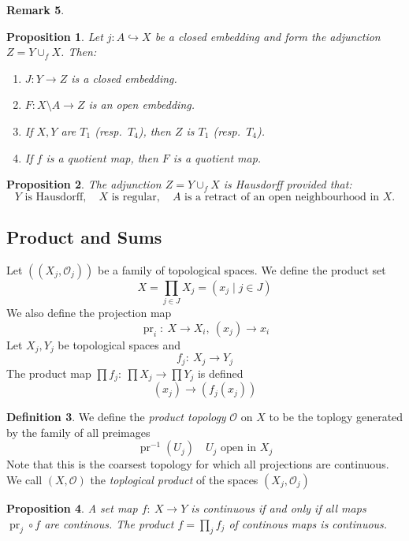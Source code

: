\documentclass[11pt,a4paper]{article}
\theoremstyle{definition}
\newtheorem{definition}{Definition}[section]
\newtheorem{remark}[definition]{Remark}
\theoremstyle{plain}
\newtheorem{proposition}[definition]{Proposition}
\theoremstyle{remark}
\begin{document}
\begin{remark}
\begin{proposition}
Let \(j\colon A\hookrightarrow X\) be a \emph{closed embedding} and form the adjunction \(Z=Y\cup_f X\).  Then:
\begin{enumerate}
  \item \(J\colon Y\to Z\) is a closed embedding.
  \item \(F\colon X\setminus A \to Z\) is an open embedding.
  \item If \(X,Y\) are \(T_1\) (resp.\ \(T_4\)), then \(Z\) is \(T_1\) (resp.\ \(T_4\)).
  \item If \(f\) is a quotient map, then \(F\) is a quotient map.
\end{enumerate}
\end{proposition}

\begin{proposition}
The adjunction \(Z=Y\cup_f X\) is Hausdorff provided that:
\[
  Y \text{ is Hausdorff}, 
  \quad
  X \text{ is regular}, 
  \quad
  A \text{ is a retract of an open neighbourhood in }X.
\]
\end{proposition}

\subsection{Product and Sums} 

Let $((X_j, \mathcal{O}_j))$ be a family of topological spaces. We define the product set 
$$X = \prod_{j \in J} X_j = (x_j \mid j \in J)$$ 
We also define the projection map 
$$\operatorname{pr}_i \colon \: X \to X_i, \ (x_j) \to x_i$$ 
Let $X_j, Y_j$ be topological spaces and 
$$f_j \colon \: X_j \to Y_j$$
The product map $\prod f_j \colon \: \prod X_j \to \prod Y_j$ is defined 
$$(x_j) \to (f_j(x_j))$$

\begin{definition}
  We define the \emph{product topology} $\mathcal{O}$ on $X$ to be the toplogy generated by the family of all preimages 
  $$\operatorname{pr}^{-1} (U_j) \quad U_j \text{ open in } X_j$$
  Note that this is the coarsest topology for which all projections are continuous. 
  We call $(X, \mathcal{O})$ the \emph{toplogical product} of the spaces $(X_j, \mathcal{O}_j)$
\end{definition}

\begin{proposition}
  A set map $f \colon \: X \to Y$ is continuous if and only if all maps 
  $\operatorname{pr}_j \circ f$ are continous. The product $f = \prod_j f_j$ of continous maps is continuous. 
\end{proposition}


\end{remark}
\end{document}
